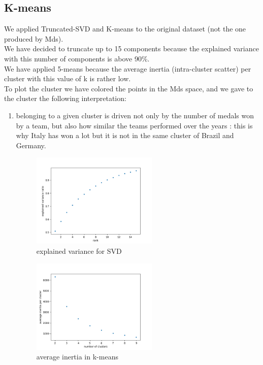 \documentclass[journal]{vgtc}                %
\begin{document}
\subsection{K-means}
We applied Truncated-SVD and K-means to the original dataset (not the one produced by Mds).\\We have decided to truncate up to 15 components because the explained variance with this number of components is above 90\%.\\We have applied 5-means because the average inertia (intra-cluster scatter) per cluster with this value of k is rather low.\\To plot the cluster we have colored the points in the Mds space, and we gave to the cluster the following interpretation:
\begin{enumerate}
\item belonging to a given cluster is driven not only by the number of medals won by a team, but also how similar the teams performed over the years : this is why Italy has won a lot but it is not in the same cluster of Brazil and Germany.
\begin{figure}[H]
	\includegraphics[width=60mm,scale=0.7]{explained-variance.png}
	\caption{explained variance for SVD}
\end{figure} 
\begin{figure}[H]
	\includegraphics[width=60mm,scale=0.7]{average-inertia.png}
	\caption{average inertia in k-means}
\end{figure} 
\end{enumerate}
\end{document}

